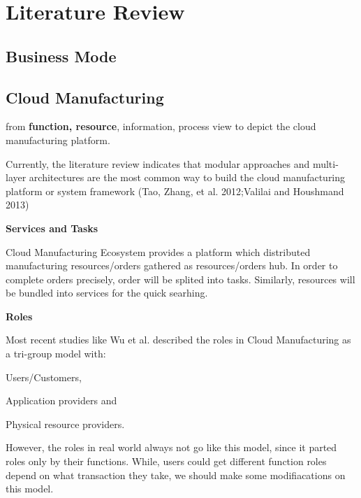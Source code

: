 \section{Literature Review} %
\label{sec:literature_review}

\subsection{Business Mode} %
\label{sub:business_mode}


\subsection{Cloud Manufacturing} %
\label{sub:cloud_manufacturing}
from \textbf{function, resource}, information, process view to depict the cloud manufacturing platform.

Currently, the literature review indicates that modular approaches and multi-layer architectures are the most common way to build the cloud manufacturing platform or system framework (Tao, Zhang, et al. 2012;Valilai and Houshmand 2013)




\textbf{Services and Tasks}

Cloud Manufacturing Ecosystem provides a platform which distributed manufacturing resources/orders gathered as resources/orders hub. In order to complete orders precisely, order will be splited into tasks. Similarly, resources will be bundled into services for the quick searhing.

\textbf{Roles}

Most recent studies like Wu et al.\cite{Wu2013} described the roles in Cloud Manufacturing as a tri-group model with:\begin{inparaenum}[1)]
\item Users/Customers,
\item Application providers and
\item Physical resource providers.
\end{inparaenum}
However, the roles in real world always not go like this model, since it parted roles only by their functions. While, users could get different function roles depend on what transaction they take, we should make some modifiacations on this model.

